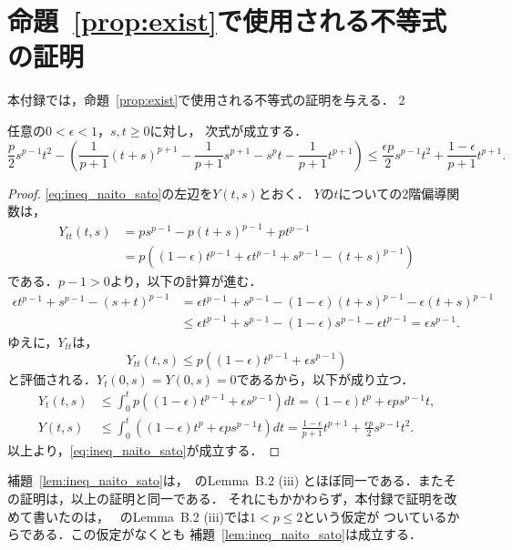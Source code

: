 
\section{命題~\ref{prop:exist}で使用される不等式の証明}

本付録では，命題~\ref{prop:exist}で使用される不等式の証明を与える．
2
\begin{lem} \label{lem:ineq_naito_sato}
 任意の$0 < \epsilon < 1$，$s, t \geq 0$に対し，
 次式が成立する．
 \begin{equation}
  \frac{p}{2}s^{p-1}t^2 - 
   \left( \frac{1}{p+1}(t+s)^{p+1} -
    \frac{1}{p+1}s^{p+1} - s^pt - \frac{1}{p+1}t^{p+1}
   \right) \leq \frac{\epsilon p}{2} s^{p-1}
   t^2 + \frac{1-\epsilon}{p+1} t^{p+1}. \label{eq:ineq_naito_sato}
 \end{equation}
\end{lem}
 
\begin{proof}
 \eqref{eq:ineq_naito_sato}の左辺を$Y(t, s)$とおく．
 $Y$の$t$についての$2$階偏導関数は，
 \begin{align*}
  Y_{tt}(t, s) &= p s^{p-1} - p(t+s)^{p-1} + pt^{p-1} \\
  &= p \left( (1- \epsilon) t^{p-1} + \epsilon t^{p-1} + s^{p-1} -
  (t+s)^{p-1} \right)
 \end{align*}
 である．$p - 1 > 0$より，以下の計算が進む．
 \begin{align*}
  \epsilon t^{p-1} + s^{p-1} - (s+t)^{p-1} &= 
  \epsilon t^{p-1} + s^{p-1} - (1-\epsilon)(t+s)^{p-1} - \epsilon
  (t+s)^{p-1} \\
  & \leq \epsilon t^{p-1} + s^{p-1} - (1-\epsilon) s^{p-1} - \epsilon
  t^{p-1} = \epsilon s^{p-1}.
 \end{align*}
 ゆえに，$Y_{tt}$は，
 \[
  Y_{tt}(t, s) \leq p \left( (1-\epsilon) t^{p-1} + \epsilon s^{p-1} \right)
 \]
 と評価される．$Y_t(0, s) = Y(0, s) = 0$であるから，以下が成り立つ．
 \begin{align*}
  Y_t(t, s) &\leq \int_0^t  p \left( (1-\epsilon) t^{p-1} + \epsilon
  s^{p-1} \right) dt = (1 - \epsilon) t^p + \epsilon p s^{p-1} t, \\
  Y(t, s) &\leq \int_0^t \left( (1 - \epsilon) t^p + \epsilon p
  s^{p-1} t \right)dt = \frac{1 -\epsilon}{p+1} t^{p+1} +
  \frac{\epsilon p}{2}s^{p-1}t^2.
 \end{align*}
 以上より，\eqref{eq:ineq_naito_sato}が成立する．\qedhere
\end{proof}

補題~\ref{lem:ineq_naito_sato}は，\cite{MR2886160}~のLemma~B.2 (iii)
とほぼ同一である．またその証明は，以上の証明と同一である．
それにもかかわらず，本付録で証明を改めて書いたのは，
\cite{MR2886160}~のLemma~B.2 (iii)では$1 < p \leq 2$という仮定が
ついているからである．この仮定がなくとも
補題~\ref{lem:ineq_naito_sato}は成立する．

